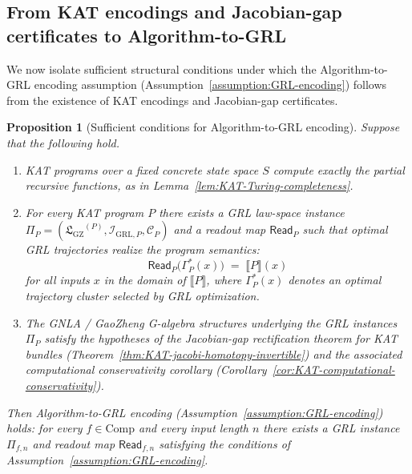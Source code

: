 \documentclass[11pt]{book}
\newcommand{\GZLS}{\ensuremath{\mathfrak{L}_{\mathrm{GZ}}}}
\theoremstyle{plain}
\newtheorem{proposition}[theorem]{Proposition}
\theoremstyle{definition}
\theoremstyle{remark}
\begin{document}
\subsection{From KAT encodings and Jacobian-gap certificates to Algorithm-to-GRL}

We now isolate sufficient structural conditions under which the
Algorithm-to-GRL encoding assumption
(Assumption~\ref{assumption:GRL-encoding}) follows from the existence
of KAT encodings and Jacobian-gap certificates.

\begin{proposition}[Sufficient conditions for Algorithm-to-GRL encoding]\label{prop:KAT-to-GRL-encoding}
Suppose that the following hold.
\begin{enumerate}[label=(\roman*)]
  \item KAT programs over a fixed concrete state space $S$ compute
        exactly the partial recursive functions, as in
        Lemma~\ref{lem:KAT-Turing-completeness}.
  \item For every KAT program $P$ there exists a GRL law-space instance
        $\Pi_P = (\GZLS^{(P)},\mathcal{I}_{\mathrm{GRL},P},
        \mathcal{C}_P)$ and a readout map
        $\mathsf{Read}_P$ such that optimal GRL trajectories realize
        the program semantics:
        \[
          \mathsf{Read}_P\bigl(\Gamma_P^\ast(x)\bigr)
          \;=\;
          \llbracket P\rrbracket(x)
        \]
        for all inputs $x$ in the domain of $\llbracket P\rrbracket$,
        where $\Gamma_P^\ast(x)$ denotes an optimal trajectory cluster
        selected by GRL optimization.
  \item The GNLA / GaoZheng G-algebra structures underlying the GRL
        instances $\Pi_P$ satisfy the hypotheses of the
        Jacobian-gap rectification theorem for KAT bundles
        (Theorem~\ref{thm:KAT-jacobi-homotopy-invertible}) and the
        associated computational conservativity corollary
        (Corollary~\ref{cor:KAT-computational-conservativity}).
\end{enumerate}
Then Algorithm-to-GRL encoding
(Assumption~\ref{assumption:GRL-encoding}) holds: for every
$f\in\mathrm{Comp}$ and every input length $n$ there exists a GRL
instance $\Pi_{f,n}$ and readout map $\mathsf{Read}_{f,n}$ satisfying
the conditions of Assumption~\ref{assumption:GRL-encoding}.
\end{proposition}
\end{document}

